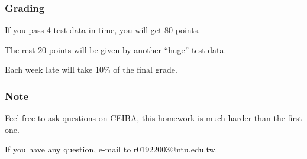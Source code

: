\documentclass{beamer}
\begin{document}
\begin{frame}
  \frametitle{Grading}
  \begin{itemize}
    {\item If you pass 4 test data in time, you will get 80 points.}
    {\item The rest 20 points will be given by another ``huge'' test data.}
    {\item Each week late will take 10\% of the final grade.}
  \end{itemize}
\end{frame}

\begin{frame}
  \frametitle{Note}
  \begin{itemize}
    {\item Feel free to ask questions on CEIBA, this homework is much harder than the first one.}
    {\item If you have any question, e-mail to r01922003@ntu.edu.tw.}
  \end{itemize}
\end{frame}
\end{document}
